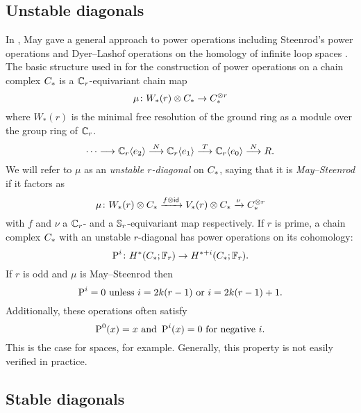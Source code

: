 \subsection{Unstable diagonals}

In \cite{may1970general}, May gave a general approach to power operations including Steenrod's power operations \cite{steenrod1962cohomology} and Dyer--Lashof operations on the homology of infinite loop spaces \cite{dyer62lashof}.
The basic structure used in \cite{may1970general} for the construction of power operations on a chain complex $C_{*}$ is a $\mathbb{C}_r$-equivariant chain map
\[
\mu \colon W_*(r) \otimes C_{*} \to C_{*}^{\otimes r}
\]
where $W_*(r)$ is the minimal free resolution of the ground ring as a module over the group ring of $\mathbb{C}_r$.
\[
\dotsb \longrightarrow \mathbb{C}_r\langle e_2\rangle \overset{N}{\longrightarrow}
\mathbb{C}_r\langle e_1\rangle \overset{T}{\longrightarrow}
\mathbb{C}_r\langle e_0\rangle \overset{N}{\longrightarrow}
R.
\]
We will refer to $\mu$ as an \textit{unstable $r$-diagonal} on $C_{*}$, saying that it is \textit{May--Steenrod} if it factors as
\[
\mu \colon W_*(r) \otimes C_{*} \xrightarrow{f \otimes \mathsf{id}} V_*(r) \otimes C_{*} \xrightarrow{\nu} C_{*}^{\otimes r}
\]
with $f$ and $\nu$ a $\mathbb{C}_r$- and a $\mathbb{S}_r$-equivariant map respectively.
If $r$ is prime, a chain complex $C_{*}$ with an unstable $r$-diagonal has power operations on its cohomology:
\[
\operatorname{P}^i \colon H^*(C_{*};\mathbb{F}_r) \to H^{*+i}(C_{*};\mathbb{F}_r).
\]
If $r$ is odd and $\mu$ is May--Steenrod then
\[
\operatorname{P}^i = 0 \text{ unless } i = 2k(r-1) \text{ or }i = 2k(r-1)+1.
\]
Additionally, these operations often satisfy
\[
\operatorname{P}^0(x) = x \text{ and }\operatorname{P}^i(x) = 0 \text{ for negative } i.
\]
This is the case for spaces, for example.
Generally, this property is not easily verified in practice.

%

\subsection{Stable diagonals}

